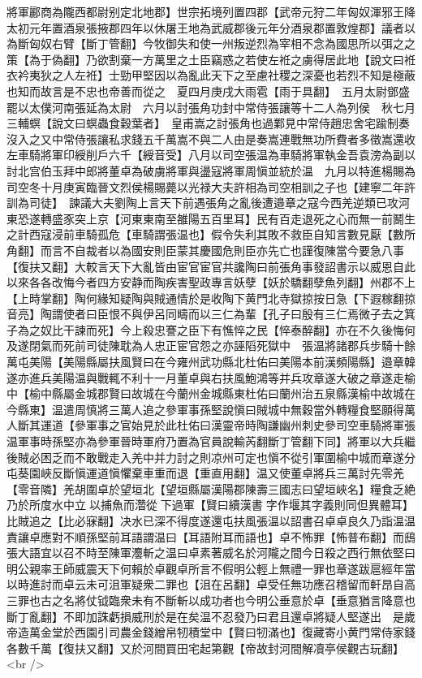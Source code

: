 將軍酈商為隴西都尉别定北地郡】世宗拓境列置四郡【武帝元狩二年匈奴渾邪王降太初元年置酒泉張掖郡四年以休屠王地為武威郡後元年分酒泉郡置敦煌郡】議者以為斷匈奴右臂【斷丁管翻】今牧御失和使一州叛逆烈為宰相不念為國思所以弭之之策【為于偽翻】乃欲割棄一方萬里之土臣竊惑之若使左袵之虜得居此地【說文曰袵衣衿夷狄之人左袵】士勁甲堅因以為亂此天下之至慮社稷之深憂也若烈不知是極蔽也知而故言是不忠也帝善而從之　夏四月庚戌大雨雹【雨于具翻】　五月太尉鄧盛罷以太僕河南張延為太尉　六月以討張角功封中常侍張讓等十二人為列侯　秋七月三輔螟【說文曰螟蟲食穀葉者】　皇甫嵩之討張角也過鄴見中常侍趙忠舍宅踰制奏沒入之又中常侍張讓私求錢五千萬嵩不與二人由是奏嵩連戰無功所費者多徵嵩還收左車騎將軍印綬削戶六千【綬音受】八月以司空張温為車騎將軍執金吾袁滂為副以討北宫伯玉拜中郎將董卓為破虜將軍與盪寇將軍周愼並統於温　九月以特進楊賜為司空冬十月庚寅臨晉文烈侯楊賜薨以光禄大夫許相為司空相訓之子也【建寧二年許訓為司徒】　諫議大夫劉陶上言天下前遇張角之亂後遭邉章之寇今西羌逆類已攻河東恐遂轉盛豕突上京【河東東南至雒陽五百里耳】民有百走退死之心而無一前鬭生之計西寇浸前車騎孤危【車騎謂張温也】假令失利其敗不救臣自知言數見厭【數所角翻】而言不自裁者以為國安則臣蒙其慶國危則臣亦先亡也謹復陳當今要急八事【復扶又翻】大較言天下大亂皆由宦官宦官共讒陶曰前張角事發詔書示以威恩自此以來各各改悔今者四方安静而陶疾害聖政專言妖孽【妖於驕翻孽魚列翻】州郡不上【上時掌翻】陶何緣知疑陶與賊通情於是收陶下黄門北寺獄掠按日急【下遐稼翻掠音亮】陶謂使者曰臣恨不與伊呂同疇而以三仁為輩【孔子曰殷有三仁焉微子去之箕子為之奴比干諫而死】今上殺忠謇之臣下有憔悴之民【悴泰醉翻】亦在不久後悔何及遂閉氣而死前司徒陳耽為人忠正宦官怨之亦誣䧟死獄中　張温將諸郡兵步騎十餘萬屯美陽【美陽縣屬扶風賢曰在今雍州武功縣北杜佑曰美陽本前漢頻陽縣】邉章韓遂亦進兵美陽温與戰輒不利十一月董卓與右扶風鮑鴻等并兵攻章遂大破之章遂走榆中【榆中縣屬金城郡賢曰故城在今蘭州金城縣東杜佑曰蘭州治五泉縣漢榆中故城在今縣東】温遣周慎將三萬人追之參軍事孫堅說愼曰賊城中無穀當外轉糧食堅願得萬人斷其運道【參軍事之官始見於此杜佑曰漢靈帝時陶謙幽州刺史參司空車騎將軍張温軍事時孫堅亦為參軍晉時軍府乃置為官員說輸芮翻斷丁管翻下同】將軍以大兵繼後賊必困乏而不敢戰走入羌中并力討之則凉州可定也愼不從引軍圍榆中城而章遂分屯葵園峽反斷愼運道愼懼棄車重而退【重直用翻】温又使董卓將兵三萬討先零羌【零音隣】羌胡圍卓於望垣北【望垣縣屬漢陽郡陳壽三國志曰望垣峽名】糧食乏絶乃於所度水中立以捕魚而濳從下過軍【賢曰續漢書字作堰其字義則同但異體耳】比賊追之【比必寐翻】决水已深不得度遂還屯扶風張温以詔書召卓卓良久乃詣温温責讓卓應對不順孫堅前耳語謂温曰【耳語附耳而語也】卓不怖罪【怖普布翻】而䲭張大語宜以召不時至陳軍灋斬之温曰卓素著威名於河隴之間今日殺之西行無依堅曰明公親率王師威震天下何賴於卓觀卓所言不假明公輕上無禮一罪也章遂跋扈經年當以時進討而卓云未可沮軍疑衆二罪也【沮在呂翻】卓受任無功應召稽留而軒昂自高三罪也古之名將仗钺臨衆未有不斷斬以成功者也今明公垂意於卓【垂意猶言降意也斷丁亂翻】不即加誅虧損威刑於是在矣温不忍發乃曰君且還卓將疑人堅遂出　是歲帝造萬金堂於西園引司農金錢繒帛牣積堂中【賢曰牣滿也】復藏寄小黄門常侍家錢各數千萬【復扶又翻】又於河間買田宅起第觀【帝故封河間解凟亭侯觀古玩翻】<br />
